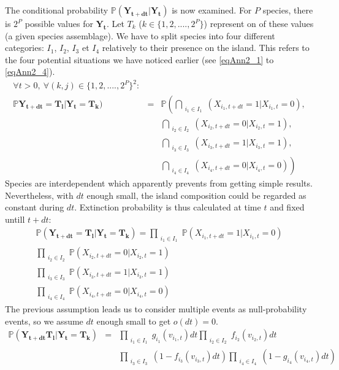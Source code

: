 The conditional probability $\mathbb{P}(\mathbf{Y_{t+dt}}|\mathbf{Y_t})$ is now examined. For $P$ species, there is $2^P$ possible values for $\mathbf{Y_t}$. Let $T_k$ ($k\in \{1, 2,...., 2^P\}$) represent on of these values (a given species assemblage). We have to split species into four different categories: $I_1$, $I_2$, $I_3$ et $I_4$ relatively to their presence on the island. This refers to the four potential situations we have noticed earlier (see \eqref{eqAnn2_1} to \eqref{eqAnn2_4}).
\begin{eqnarray}
\nonumber \forall{t} >0, ~\forall{(k,j)} \in \{1, 2,...., 2^P\}^2: & &\\
\nonumber \label{eqAnn2_12}  \mathbb{P} \mathbf{\mathbf{Y_{t+dt}}}=\mathbf{T_l}|\mathbf{\mathbf{Y_t}}=\mathbf{T_k})
 & = & \mathbb{P}\left(
    \bigcap_{\substack{i_1\in I_1}}(X_{i_1,t+dt}=1|X_{i_1,t}=0)\right., \\
  \nonumber & & \bigcap_{\substack{i_2\in I_2}}(X_{i_2,t+dt}=0|X_{i_2,t}=1), \\
  \nonumber & & \bigcap_{\substack{i_3\in I_3}}(X_{i_3,t+dt}=1|X_{i_3,t}=1), \\
  \label{eqAnn2_13} & & \left.\bigcap_{\substack{i_4\in I_4}}(X_{i_4,t+dt}=0|X_{i_4,t}=0)\right)
\end{eqnarray}
Species are interdependent which apparently prevents from getting simple results. Nevertheless,
with $dt$ enough small, the island composition could be regarded as constant during $dt$. Extinction probability is thus calculated at time $t$ and fixed untill $t+dt$:
\begin{eqnarray}
\nonumber \mathbb{P}(\mathbf{\mathbf{Y_{t+dt}}}=\mathbf{T_l}|\mathbf{\mathbf{Y_t}} = \mathbf{T_k})= \prod_{\substack{i_1\in I_1}}\mathbb{P}(X_{i_1,t+dt}=1|X_{i_1,t}=0) \\
\nonumber           \prod_{\substack{i_2\in I_2}}\mathbb{P}(X_{i_2,t+dt}=0|X_{i_2,t}=1)  \\
\nonumber           \prod_{\substack{i_3\in I_3}}\mathbb{P}(X_{i_3,t+dt}=1|X_{i_3,t}=1) \\
\label{eqAnn2_13}   \prod_{\substack{i_4\in I_4}}\mathbb{P}(X_{i_4,t+dt}=0|X_{i_4,t}=0)
\end{eqnarray}
The previous assumption leads us to consider multiple events as null-probability events, so we assume $dt$ enough small to get $o(dt)=0$.
\begin{eqnarray}
\nonumber \mathbb{P}(\mathbf{\mathbf{Y_{t+dt}}} \mathbf{T_l}|\mathbf{\mathbf{Y_t}}=\mathbf{T_k})&=&\prod_{\substack{i_1\in I_1}}g_{i_1}(v_{i_1,t})dt \prod_{\substack{i_2\in I_2}}f_{i_2}(v_{i_2,t})dt  \\
\label{eqAnn2_2.4}  & & \prod_{\substack{i_3\in I_3}}(1-f_{i_3}(v_{i_3,t})dt ) \prod_{\substack{i_4\in I_4}}(1-g_{i_4}(v_{i_4,t})dt)
\end{eqnarray}




